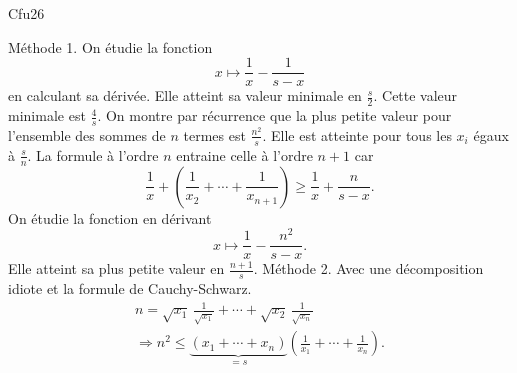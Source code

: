 \begin{tiny}Cfu26\end{tiny}
Méthode 1. On étudie la fonction
\[
  x \mapsto \frac{1}{x} - \frac{1}{s-x}
\]
en calculant sa dérivée. Elle atteint sa valeur minimale en $\frac{s}{2}$. Cette valeur minimale est $\frac{4}{s}$.\newline
On montre par  récurrence que la plus petite valeur pour l'ensemble des sommes de $n$ termes est $\frac{n^2}{s}$. Elle est atteinte pour tous les $x_i$ égaux à $\frac{s}{n}$. \newline
La formule à l'ordre $n$ entraine celle à l'ordre $n+1$ car
\[
  \frac{1}{x} + \left(\frac{1}{x_2}+ \cdots + \frac{1}{x_{n+1}}\right)
  \geq \frac{1}{x} + \frac{n}{s-x}.
\]
On étudie la fonction en dérivant
\[
  x \mapsto \frac{1}{x} - \frac{n^2}{s-x}.
\]
Elle atteint sa plus petite valeur en $\frac{n+1}{s}$.\newline
Méthode 2. Avec une décomposition idiote et la formule de Cauchy-Schwarz.
\begin{multline*}
  n = \sqrt{x_1}\, \frac{1}{\sqrt{x_1}} + \cdots + \sqrt{x_2}\, \frac{1}{\sqrt{x_n}}\\
  \Rightarrow
  n^2 \leq \underset{ = s}{\underbrace{\left( x_1 + \cdots + x_n\right)}}\left( \frac{1}{x_1} + \cdots + \frac{1}{x_n}\right).
\end{multline*}
